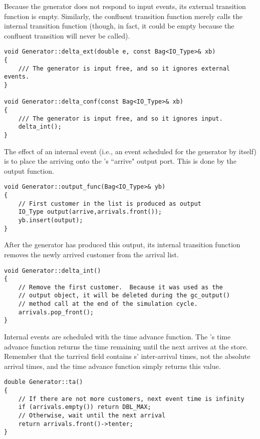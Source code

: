 Because the generator does not respond to input events, its external transition function is empty. Similarly, the confluent transition function merely calls the internal transition function (though, in fact, it could be empty because the confluent transition will never be called).
\begin{verbatim}
void Generator::delta_ext(double e, const Bag<IO_Type>& xb)
{
    /// The generator is input free, and so it ignores external events.
}

void Generator::delta_conf(const Bag<IO_Type>& xb)
{
    /// The generator is input free, and so it ignores input.
    delta_int();
}
\end{verbatim}

The effect of an internal event (i.e., an event scheduled for the generator by itself) is to place the arriving  onto the 's ``arrive" output port. This is done by the output function.
\begin{verbatim}
void Generator::output_func(Bag<IO_Type>& yb)
{
    // First customer in the list is produced as output
    IO_Type output(arrive,arrivals.front());
    yb.insert(output);
}
\end{verbatim}
After the generator has produced this output, its internal transition function removes the newly arrived customer from the arrival list.
\begin{verbatim}
void Generator::delta_int()
{
    // Remove the first customer.  Because it was used as the
    // output object, it will be deleted during the gc_output()
    // method call at the end of the simulation cycle.
    arrivals.pop_front();
}
\end{verbatim}

Internal events are scheduled with the time advance function. The 's time advance function returns the time remaining until the next  arrives at the store. Remember that the tarrival field contains s' inter-arrival times, not the absolute arrival times, and the time advance function simply returns this value.
\begin{verbatim}
double Generator::ta()
{
    // If there are not more customers, next event time is infinity
    if (arrivals.empty()) return DBL_MAX;
    // Otherwise, wait until the next arrival
    return arrivals.front()->tenter;
}
\end{verbatim}

